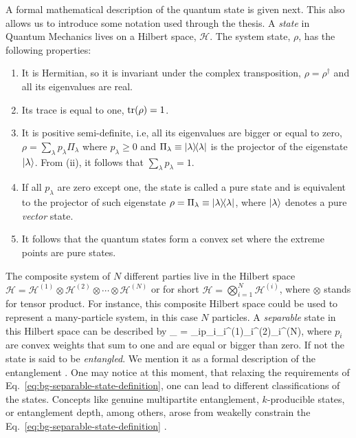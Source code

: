 A formal mathematical description of the quantum state is given next.
This also allows us to introduce some notation used through the thesis.
A \emph{state} in Quantum Mechanics lives on a Hilbert space, $\mathcal{H}$.
The system state, $\rho$, has the following properties:
\begin{enumerate}
  \item
  It is Hermitian, so it is invariant under the complex transposition, $\rho=\rho^\dagger$ and all its eigenvalues are real.
  \item Its trace is equal to one, $\operatorname{tr}(\rho)=1$.
  \item It is positive semi-definite, i.e, all its eigenvalues are bigger or equal to zero, $\rho=\sum_{\lambda}p_\lambda \Pi_\lambda$ where $p_\lambda\geq 0$ and $\Pi_\lambda\equiv\vert \lambda \rangle \! \langle \lambda \vert$ is the projector of the eigenstate $\vert \lambda \rangle$.
  From (ii), it follows that $\sum_\lambda p_\lambda = 1$.
  \item If all $p_\lambda$ are zero except one, the state is called a pure state and is equivalent to the projector of such eigenstate $\rho=\Pi_\lambda\equiv\vert \lambda \rangle \! \langle \lambda \vert$, where $\vert \lambda \rangle$ denotes a pure \emph{vector} state.
  \item It follows that the quantum states form a convex set where the extreme points are pure states.
\end{enumerate}

The composite system of $N$ different parties live in the Hilbert space $\mathcal{H} = \mathcal{H}^{(1)}\otimes\mathcal{H}^{(2)}\otimes\cdots\otimes\mathcal{H}^{(N)}$ or for short $\mathcal{H} = \bigotimes_{i=1}^N\mathcal{H}^{(i)}$, where $\otimes$ stands for tensor product.
For instance, this composite Hilbert space could be used to represent a many-particle system, in this case $N$ particles.
A \emph{separable} state in this Hilbert space can be described by
\be
  \label{eq:bg-separable-state-definition}
  \rho_{} = \sum_{i}p_i\rho_i^{(1)}\otimes\rho_i^{(2)}\otimes\cdots\otimes\rho_i^{(N)},
\ee
where $p_i$ are convex weights that sum to one and are equal or bigger than zero.
If not the state is said to be \emph{entangled}.
We mention it as a formal description of the entanglement \citep{}.
One may notice at this moment, that relaxing the requirements of Eq.~\eqref{eq:bg-separable-state-definition}, one can lead to different classifications of the states.
Concepts like genuine multipartite entanglement, $k$-producible states, or entanglement depth, among others, arose from weakelly constrain the Eq.~\eqref{eq:bg-separable-state-definition} \citep{}.

